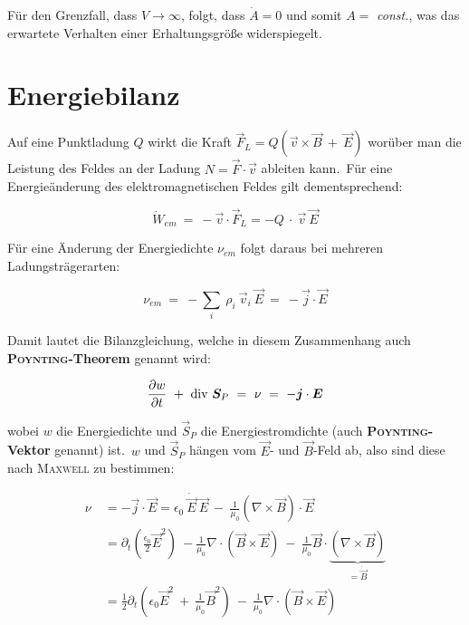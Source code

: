 Für den Grenzfall, dass $V\rightarrow\infty$, folgt, dass $\dot{A}=0$ und somit $A =$ \textit{const.}, was das erwartete Verhalten einer Erhaltungsgröße widerspiegelt.

\section{Energiebilanz}

Auf eine Punktladung $Q$ wirkt die Kraft $\vec{F}_L = Q(\vec{v}\times\vec{B} \ + \ \vec{E})$ worüber man die Leistung des Feldes an der Ladung $N = \vec{F}\cdot\vec{v}$ ableiten kann.\
Für eine Energieänderung des elektromagnetischen Feldes gilt dementsprechend:

\begin{equation*}
\dot{W}_{em} \ = \ -\vec{v}\cdot\vec{F}_L = -Q \ \cdot \ \vec{v} \ \vec{E}
\end{equation*}

Für eine Änderung der Energiedichte $\nu_{em}$ folgt daraus bei mehreren Ladungsträgerarten:

\begin{equation*}
\nu_{em} \ =  \ - \sum_i \ \rho_i \ \vec{v}_i \ \vec{E} \ = \ - \vec{j}\cdot\vec{E}
\end{equation*}

Damit lautet die Bilanzgleichung, welche in diesem Zusammenhang auch  \textbf{\textsc{Poynting}-Theorem} genannt wird:

\begin{equation*}
\pdiff{w}{t} \ + \ \div \vec{S}_P \ = \ \nu \ = \ -\vec{j} \cdot \vec{E}
\end{equation*}

wobei $w$ die Energiedichte und $\vec{S}_P$ die Energiestromdichte (auch \textbf{\textsc{Poynting}-Vektor} genannt) ist.\
$w$ und $\vec{S}_P$ hängen vom $\vec{E}$- und $\vec{B}$-Feld ab, also sind diese nach \textsc{Maxwell} zu bestimmen:

\begin{align*}
\nu \ &= -\vec{j}\cdot\vec{E} = \epsilon_0 \ \dot{\vec{E}} \ \vec{E} \ - \ \frac{1}{\mu_0} \left(\nabla\times\vec{B}\right) \cdot \vec{E}\\
&= \partial_t \left(\frac{\epsilon_0}{2} \vec{E}^2\right) \ - \frac{1}{\mu_0} \nabla \cdot (\vec{B}\times\vec{E}) \ - \ \frac{1}{\mu_0} \vec{B}\cdot \underbrace{(\nabla\times\vec{B})}_{= \dot{\vec{B}}}\\
&= \frac{1}{2}\partial_t \left(\epsilon_0\vec{E}^2 \ + \ \frac{1}{\mu_0}\vec{B}^2\right) \ - \ \frac{1}{\mu_0}\nabla \cdot (\vec{B}\times\vec{E})
\end{align*}


